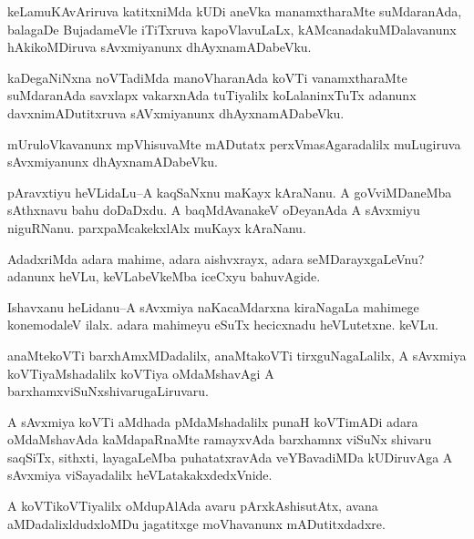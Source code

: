 \documentclass{article}
\begin{document}
\begin{mn}%
keLamuKAvAriruva katitxniMda kUDi aneVka manamxtharaMte suMdaranAda, balagaDe BujadameVle 
iTiTxruva kapoVlavuLaLx, kAMcanadakuMDalavanunx hAkikoMDiruva sAvxmiyanunx dhAyxnamADabeVku.
\end{mn}

\begin{mn}%
kaDegaNiNxna noVTadiMda manoVharanAda koVTi vanamxtharaMte suMdaranAda savxlapx vakarxnAda 
tuTiyalilx koLalaninxTuTx adanunx davxnimADutitxruva sAVxmiyanunx dhAyxnamADabeVku.
\end{mn}

\begin{mn}%
mUruloVkavanunx mpVhisuvaMte mADutatx perxVmasAgaradalilx muLugiruva sAvxmiyanunx 
dhAyxnamADabeVku.
\end{mn}

\begin{mn}%
pAravxtiyu heVLidaLu--A kaqSaNxnu maKayx kAraNanu. A goVviMDaneMba sAthxnavu bahu doDaDxdu.
A baqMdAvanakeV oDeyanAda A sAvxmiyu niguRNanu. parxpaMcakekxlAlx muKayx kAraNanu.
\end{mn}

\begin{mn}%
AdadxriMda adara mahime, adara aishvxrayx, adara seMDarayxgaLeVnu? adanunx heVLu, 
keVLabeVkeMba iceCxyu bahuvAgide.
\end{mn}

\begin{mn}%
Ishavxanu heLidanu--A sAvxmiya naKacaMdarxna kiraNagaLa mahimege konemodaleV ilalx. adara 
mahimeyu eSuTx hecicxnadu heVLutetxne. keVLu.
\end{mn}

\begin{mn}%
anaMtekoVTi barxhAmxMDadalilx, anaMtakoVTi tirxguNagaLalilx, A sAvxmiya koVTiyaMshadalilx 
koVTiya oMdaMshavAgi A barxhamxviSuNxshivarugaLiruvaru. 
\end{mn}

\begin{mn}%
A sAvxmiya koVTi aMdhada pMdaMshadalilx punaH koVTimADi adara oMdaMshavAda kaMdapaRnaMte 
ramayxvAda barxhamnx viSuNx shivaru saqSiTx, sithxti, layagaLeMba puhatatxravAda 
veYBavadiMDa kUDiruvAga A sAvxmiya viSayadalilx heVLatakakxdedxVnide.
\end{mn}

\begin{mn}%
A koVTikoVTiyalilx oMdupAlAda avaru pArxkAshisutAtx, avana aMDadalixldudxloMDu jagatitxge 
moVhavanunx mADutitxdadxre.
\end{mn}
\end{document}
